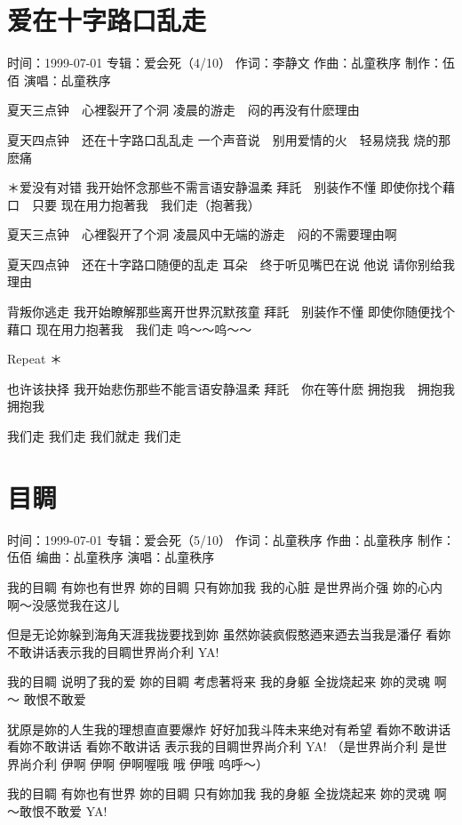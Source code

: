 \documentclass[UTF8,a4paper,oneside,twocolumn,12pt]{ctexbook}
\newcommand{\infopair}[2]{\textbullet #1：#2}
\newcommand{\zc}[1][伍佰]{\infopair{作词}{#1}}
\newcommand{\zq}[1][伍佰]{\infopair{作曲}{#1}}
\newcommand{\bq}[1][伍佰]{\infopair{编曲}{#1}}
\newcommand{\zj}[1]{\infopair{专辑}{#1}}
\newcommand{\zz}[1]{\infopair{制作}{#1}}
\newcommand{\sj}[1]{\infopair{时间}{#1}}
\newenvironment{info}{\begin{flushleft}\kaishu
	}
	{\end{flushleft}\normalsize\yahei\par}
\newenvironment{lyric}{
	}
{}
\begin{document}
\section{爱在十字路口乱走}
\begin{info}
	\sj{1999-07-01}
	\zj{爱会死（4/10）}
	\zc[李静文]
	\zq[乩童秩序]
	\zz{伍佰}
	\infopair{演唱}{乩童秩序}
\end{info}
\begin{lyric}
	夏天三点钟　心裡裂开了个洞
	凌晨的游走　闷的再没有什麽理由

	夏天四点钟　还在十字路口乱乱走
	一个声音说　别用爱情的火　轻易烧我
	烧的那麽痛

	＊爱没有对错
	我开始怀念那些不需言语安静温柔
	拜託　别装作不懂
	即使你找个藉口　只要
	现在用力抱著我　我们走（抱著我）

	夏天三点钟　心裡裂开了个洞
	凌晨风中无端的游走　闷的不需要理由啊

	夏天四点钟　还在十字路口随便的乱走
	耳朵　终于听见嘴巴在说
	他说  请你别给我理由

	背叛你逃走
	我开始瞭解那些离开世界沉默孩童
	拜託　别装作不懂
	即使你随便找个藉口
	现在用力抱著我　我们走
	呜～～呜～～

	Repeat ＊

	也许该抉择
	我开始悲伤那些不能言语安静温柔
	拜託　你在等什麽
	拥抱我　拥抱我　拥抱我

	我们走 我们走  我们就走  我们走
\end{lyric}

\section{目睭}
\begin{info}
	\sj{1999-07-01}
	\zj{爱会死（5/10）}
	\zc[乩童秩序]
	\zq[乩童秩序]
	\zz{伍佰}
	\bq[乩童秩序]
	\infopair{演唱}{乩童秩序}
\end{info}
\begin{lyric}
	我的目睭 有妳也有世界 妳的目睭 只有妳加我
	我的心脏 是世界尚介强 妳的心内 啊～没感觉我在这儿

	但是无论妳躲到海角天涯我拢要找到妳 虽然妳装疯假憨迺来迺去当我是潘仔
	看妳不敢讲话表示我的目睭世界尚介利 YA!

	我的目睭 说明了我的爱 妳的目睭 考虑著将来
	我的身躯 全拢烧起来 妳的灵魂 啊～ 敢恨不敢爱

	犹原是妳的人生我的理想直直要爆炸 好好加我斗阵未来绝对有希望
	看妳不敢讲话 看妳不敢讲话 看妳不敢讲话 表示我的目睭世界尚介利 YA!
	（是世界尚介利 是世界尚介利 伊啊 伊啊 伊啊喔哦 哦 伊哦 呜呼～）

	我的目睭 有妳也有世界 妳的目睭 只有妳加我
	我的身躯 全拢烧起来 妳的灵魂 啊～敢恨不敢爱 YA!
\end{lyric}
\end{document}
